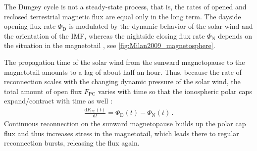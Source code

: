 The Dungey cycle is not a steady-state process, that is, the rates of opened and reclosed terrestrial magnetic flux are equal only in the long term. The dayside opening flux rate $\Phi_\text{D}$ is modulated by the dynamic behavior of the solar wind and the orientation of the IMF, whereas the nightside closing flux rate $\Phi_\text{N}$ depends on the situation in the magnetotail \citep{Milan2007}, see \autoref{fig:Milan2009_magnetosphere}.
\begin{figure}[htb]
\end{figure}
The propagation time of the solar wind from the sunward magnetopause to the magnetotail amounts to a lag of about half an hour. Thus, because the rate of reconnection scales with the changing dynamic pressure of the solar wind, the total amount of open flux $F_\text{PC}$ varies with time so that the ionospheric polar caps expand/contract with time as well \citep{Siscoe1985}:
\begin{align}
	\frac{\text{d}F_\text{PC}(t)}{\text{d}t} = \Phi_\text{D}(t) - \Phi_\text{N}(t)	\,.	\label{eq:faradays_law}
\end{align}
Continuous reconnection on the sunward magnetopause builds up the polar cap flux and thus increases stress in the magnetotail, which leads there to regular reconnection bursts, releasing the flux again.

